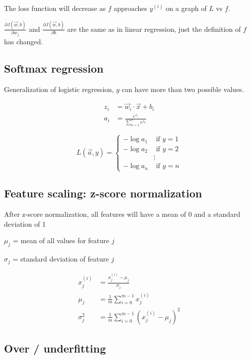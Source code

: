 \documentclass[12pt]{article}
\begin{document}
The loss function will decrease as $f$ approaches $y^{(i)}$ on a graph of $L$ vs $f$.

$\frac{\partial J(\vec{w},b)}{\partial w_j}$ and $\frac{\partial J(\vec{w},b)}{\partial b}$ are the same as in linear regression, just the definition of $f$ has changed.

\subsection{Softmax regression}

Generalization of logistic regression, $y$ can have more than two possible values.

\begin{align*}
z_i &= \vec{w}_i \cdot \vec{x} + b_i\\
a_i &= \frac{e^{z_i}}{\sum_{k=1}^{n} e^{z_k}}
\end{align*}

\begin{equation}
L(\vec{a}, y) =
  \left\{
    \begin{aligned}
    -\log a_1 &\text{ if } y = 1\\
    -\log a_2 &\text{ if } y = 2\\
    & \vdots\\
    -\log a_n &\text{ if } y = n
    \end{aligned}
   \right.
\end{equation}

\subsection{Feature scaling: z-score normalization}

After z-score normalization, all features will have a mean of 0 and a standard deviation of 1

$\mu_j$ = mean of all values for feature $j$

$\sigma_j$ = standard deviation of feature $j$

\begin{align*}
x_j^{(i)} &= \frac{x_j^{(i)} - \mu_j}{\sigma_j}\\
\mu_j &= \frac{1}{m} \sum_{i=0}^{m-1} x_j^{(i)}\\
\sigma_j^2 &= \frac{1}{m} \sum_{i=0}^{m-1} (x_j^{(i)} - \mu_j)^2
\end{align*}

\subsection{Over / underfitting}
\end{document}
